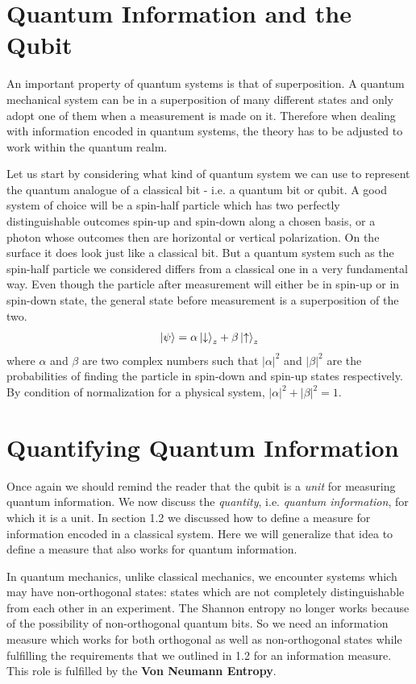 \section{Quantum Information and the Qubit}
\par An important property of quantum systems is that of superposition. A quantum mechanical system can be in a superposition of many different states and only adopt one of them when a measurement is made on it. Therefore when dealing with information encoded in quantum systems, the theory has to be adjusted to work within the quantum realm.
\par Let us start by considering what kind of quantum system we can use to represent the quantum analogue of a classical bit - i.e. a quantum bit or qubit. A good system of choice will be a spin-half particle which has two perfectly distinguishable outcomes spin-up and spin-down along a chosen basis, or a photon whose outcomes then are horizontal or vertical polarization. On the surface it does look just like a classical bit. But a quantum system such as the spin-half particle we considered differs from a classical one in a very fundamental way. Even though the particle after measurement will either be in spin-up or in spin-down state, the general state before measurement is a superposition of the two.
\begin{align*}
\Ket{\psi} = \alpha \Ket{\downarrow}_z + \beta \Ket{\uparrow}_z
\end{align*}
where $\alpha$ and $\beta$ are two complex numbers such that $|\alpha|^2$ and $|\beta|^2$ are the probabilities of finding the particle in spin-down and spin-up states respectively. By condition of normalization for a physical system, $|\alpha|^2 + |\beta|^2 = 1$.


\section{Quantifying Quantum Information}
\par Once again we should remind the reader that the qubit is a \textit{unit} for measuring quantum information. We now discuss the \textit{quantity}, i.e. \textit{quantum information}, for which it is a unit. In section 1.2 we discussed how to define a measure for information encoded in a classical system. Here we will generalize that idea to define a measure that also works for quantum information.
\par In quantum mechanics, unlike classical mechanics, we encounter systems which may have non-orthogonal states: states which are not completely distinguishable from each other in an experiment. The Shannon entropy no longer works because of the possibility of non-orthogonal quantum bits. So we need an information measure which works for both orthogonal as well as non-orthogonal states while fulfilling the requirements that we outlined in 1.2 for an information measure. This role is fulfilled by the \textbf{Von Neumann Entropy}.
